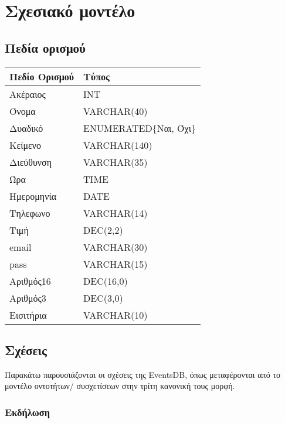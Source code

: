 ﻿
\section{Σχεσιακό μοντέλο}

\subsection{Πεδία ορισμού}


\begin{tabular}{|p{6cm}|p{8cm}|}
\hline
  \textbf{Πεδίο Ορισμού} & \textbf{Τύπος}         \\ \hline
  Ακέραιος               & INT                    \\ \hline
  Όνομα                  & VARCHAR(40)            \\ \hline
  Δυαδικό                & ENUMERATED\{Ναι, Όχι\} \\ \hline
  Κείμενο                & VARCHAR(140)           \\ \hline
  Διεύθυνση              & VARCHAR(35)            \\ \hline
  Ώρα                    & TIME                   \\ \hline
  Ημερομηνία             & DATE                   \\ \hline
  Τηλεφωνο               & VARCHAR(14)            \\ \hline
  Τιμή                   & DEC(2,2)               \\ \hline
  email                  & VARCHAR(30)            \\ \hline
  pass                   & VARCHAR(15)            \\ \hline
  Αριθμός16              & DEC(16,0)              \\ \hline
  Αριθμός3               & DEC(3,0)               \\ \hline
  Εισιτήρια              & VARCHAR(10)            \\ \hline
\end{tabular}

\subsection{Σχέσεις}

Παρακάτω παρουσιάζονται οι σχέσεις της EventsDB, όπως μεταφέρονται από
το μοντέλο οντοτήτων/ συσχετίσεων στην τρίτη κανονική τους μορφή.

\subsubsection*{Εκδήλωση}

